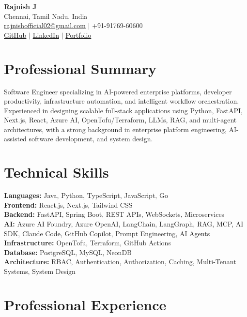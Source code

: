 \documentclass[a4paper,10.5pt]{article}
\begin{document}
\begin{center}
{\LARGE\textbf{Rajnish J}}\\[4pt]
Chennai, Tamil Nadu, India\\[2pt]
\href{mailto:rajnishofficial02@gmail.com}{rajnishofficial02@gmail.com} $|$
+91-91769-60600\\[2pt]
\href{https://github.com/Rajnish-J}{GitHub} $|$
\href{https://www.linkedin.com/in/rajnish7102/}{LinkedIn} $|$
\href{https://rajnish7102.netlify.app/}{Portfolio}
\end{center}

\section*{Professional Summary}
Software Engineer specializing in AI-powered enterprise platforms, developer productivity, infrastructure automation, and intelligent workflow orchestration. Experienced in designing scalable full-stack applications using Python, FastAPI, Next.js, React, Azure AI, OpenTofu/Terraform, LLMs, RAG, and multi-agent architectures, with a strong background in enterprise platform engineering, AI-assisted software development, and system design.

\section*{Technical Skills}
\textbf{Languages:} Java, Python, TypeScript, JavaScript, Go\\
\textbf{Frontend:} React.js, Next.js, Tailwind CSS\\
\textbf{Backend:} FastAPI, Spring Boot, REST APIs, WebSockets, Microservices\\
\textbf{AI:} Azure AI Foundry, Azure OpenAI, LangChain, LangGraph, RAG, MCP, AI SDK, Claude Code, GitHub Copilot, Prompt Engineering, AI Agents\\
\textbf{Infrastructure:} OpenTofu, Terraform, GitHub Actions\\
\textbf{Database:} PostgreSQL, MySQL, NeonDB\\
\textbf{Architecture:} RBAC, Authentication, Authorization, Caching, Multi-Tenant Systems, System Design

\section*{Professional Experience}
\end{document}
